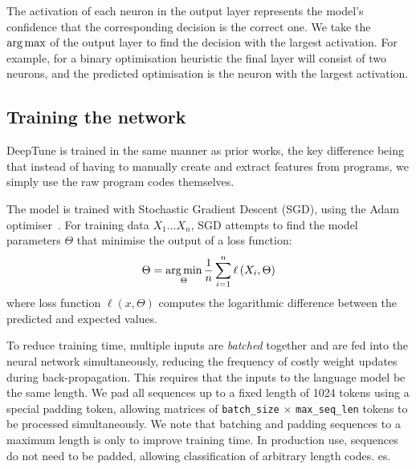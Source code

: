 The activation of each neuron in the output layer represents the model's confidence that the corresponding decision is the correct one. We take the $\operatorname*{arg\,max}$ of the output layer to find the decision with the largest activation. For example, for a binary optimisation heuristic the final layer will consist of two neurons, and the predicted optimisation is the neuron with the largest activation.


\subsection{Training the network}

DeepTune is trained in the same manner as prior works, the key difference being that instead of having to manually create and extract features from programs, we simply use the raw program codes themselves.

The model is trained with Stochastic Gradient Descent (SGD), using the Adam optimiser~\cite{Kingma2015}. For training data $X_1 \ldots X_n$, SGD attempts to find the model parameters $\Theta$ that minimise the output of a loss function:
%
\begin{equation}
\Theta = \operatorname*{arg\,min}_{\Theta} \frac{1}{n} \sum_{i=1}^{n} \ell \left(X_i, \Theta \right)
\end{equation}
%
where loss function $\ell \left(x, \Theta \right)$ computes the logarithmic difference between the predicted and expected values.

To reduce training time, multiple inputs are \emph{batched} together and are fed into the neural network simultaneously, reducing the frequency of costly weight updates during back-propagation. This requires that the inputs to the language model be the same length. We pad all sequences up to a fixed length of 1024 tokens using a special padding token, allowing matrices of \texttt{batch\_size} $\times$ \texttt{max\_seq\_len} tokens to be processed simultaneously. We note that batching and padding sequences to a maximum length is only to improve training time. In production use, sequences do not need to be padded, allowing classification of arbitrary length codes.
es.

